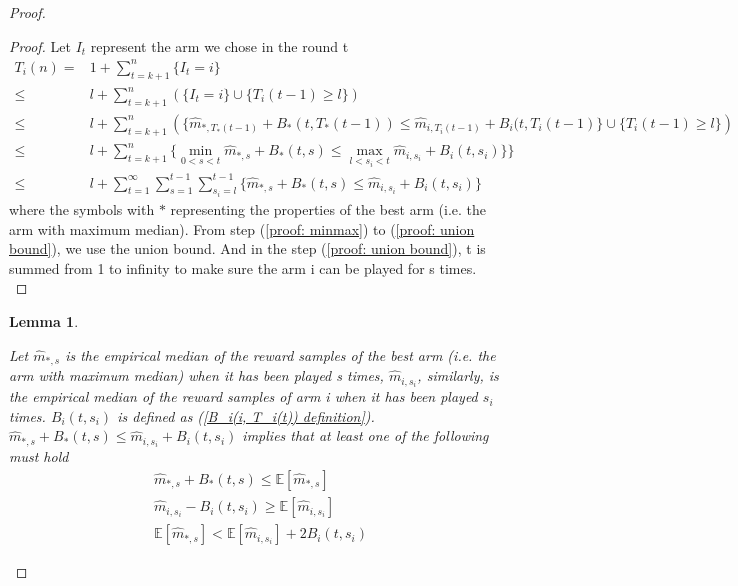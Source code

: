\documentclass{article}
\theoremstyle{plain}
\newtheorem{lemma}{Lemma}
\begin{document}
\begin{proof}
\begin{proof}
Let $I_t$ represent the arm we chose in the round t
    \begin{align}
        T_i(n) =& 1 + \sum_{t = k + 1}^n \{I_t = i\}\\
       \leq & l + \sum_{t = k + 1}^n (\{I_t = i\} \cup \{T_i(t-1) \geq l\})\\
       \leq & l + \sum_{t = k + 1}^n \left(\{ \hat{m}_{*, T_*(t-1)} + B_*(t, T_*(t-1)) \leq \hat{m}_{i, T_i(t-1)} + B_i(t, T_i(t-1)\} \cup \{ T_i(t-1) \geq l\}\right)\\
       \label{proof: minmax}
       \leq & l + \sum_{t = k + 1}^n \{ \mathop{min}\limits_{0 < s < t}\hat{m}_{*, s} + B_*(t, s) \leq \mathop{max}\limits_{l < s_i < t}\hat{m}_{i, s_i} + B_i(t, s_i)\}\}\\
       \label{proof: union bound}
       \leq & l + \sum_{t = 1}^\infty \sum_{s = 1}^{t-1} \sum_{s_i = l}^{t-1} \{\hat{m}_{*, s} + B_*(t, s)  \leq \hat{m}_{i, s_i} + B_i(t, s_i)\}
    \end{align}
    where the symbols with $*$ representing the properties of the best arm (i.e. the arm with maximum median). From step (\ref{proof: minmax}) to (\ref{proof: union bound}), we use the union bound. And in the step (\ref{proof: union bound}), t is summed from 1 to infinity to make sure the arm i can be played for s times.\\
\end{proof}

\begin{lemma}
\label{lemma 7}

Let $\hat{m}_{*, s}$ is the empirical median of the reward samples of the best arm (i.e. the arm with maximum median) when it has been played s times, $\hat{m}_{i, s_i}$, similarly, is the empirical median of the reward samples of arm i when it has been played $s_i$ times. $B_i(t, s_i)$ is defined as (\ref{B_i(i, T_i(t)) definition}).\\

    $\hat{m}_{*, s} + B_*(t, s)  \leq \hat{m}_{i, s_i} + B_i(t, s_i)$ implies that at least one of the following must hold\\
    \begin{align}
        \label{lemma 7.1}
        \hat{m}_{*, s} + B_*(t, s) \leq  \mathbb{E}[\hat{m}_{*, s}]\\
        \label{lemma 7.2}
        \hat{m}_{i, s_i} - B_i(t, s_i) \geq \mathbb{E}[\hat{m}_{i, s_i}]\\
        \label{lemma 7.3}
        \mathbb{E}[\hat{m}_{*, s}] < \mathbb{E}[\hat{m}_{i, s_i}] + 2 B_i(t, s_i)
    \end{align}
\end{lemma}


\end{proof}
\end{document}
